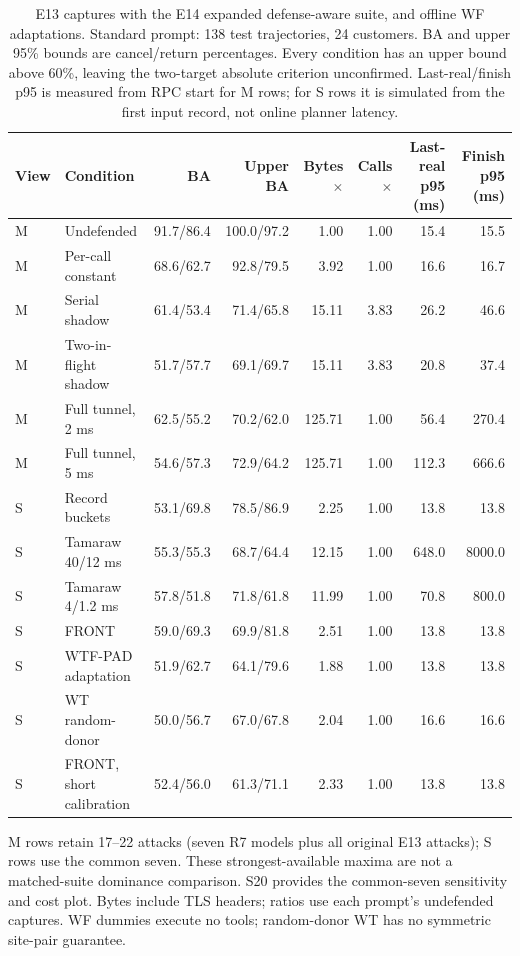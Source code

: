 \begin{table}[t]\centering\footnotesize
\caption{E13 captures with the E14 expanded defense-aware suite, and offline WF adaptations. Standard prompt: 138 test trajectories, 24 customers. BA and upper 95\% bounds are cancel/return percentages. Every condition has an upper bound above 60\%, leaving the two-target absolute criterion unconfirmed. Last-real/finish p95 is measured from RPC start for M rows; for S rows it is simulated from the first input record, not online planner latency.}\label{tab:r7-controls}
\begin{tabular}{@{}llrrrrrr@{}}\toprule
View & Condition & BA & Upper BA & Bytes$\times$ & Calls$\times$ & Last-real p95 (ms) & Finish p95 (ms)\\\midrule
M & Undefended & 91.7/86.4 & 100.0/97.2 & 1.00 & 1.00 & 15.4 & 15.5\\
M & Per-call constant & 68.6/62.7 & 92.8/79.5 & 3.92 & 1.00 & 16.6 & 16.7\\
M & Serial shadow & 61.4/53.4 & 71.4/65.8 & 15.11 & 3.83 & 26.2 & 46.6\\
M & Two-in-flight shadow & 51.7/57.7 & 69.1/69.7 & 15.11 & 3.83 & 20.8 & 37.4\\
M & Full tunnel, 2 ms & 62.5/55.2 & 70.2/62.0 & 125.71 & 1.00 & 56.4 & 270.4\\
M & Full tunnel, 5 ms & 54.6/57.3 & 72.9/64.2 & 125.71 & 1.00 & 112.3 & 666.6\\
\midrule
S & Record buckets & 53.1/69.8 & 78.5/86.9 & 2.25 & 1.00 & 13.8 & 13.8\\
S & Tamaraw 40/12 ms & 55.3/55.3 & 68.7/64.4 & 12.15 & 1.00 & 648.0 & 8000.0\\
S & Tamaraw 4/1.2 ms & 57.8/51.8 & 71.8/61.8 & 11.99 & 1.00 & 70.8 & 800.0\\
S & FRONT & 59.0/69.3 & 69.9/81.8 & 2.51 & 1.00 & 13.8 & 13.8\\
S & WTF-PAD adaptation & 51.9/62.7 & 64.1/79.6 & 1.88 & 1.00 & 13.8 & 13.8\\
S & WT random-donor & 50.0/56.7 & 67.0/67.8 & 2.04 & 1.00 & 16.6 & 16.6\\
S & FRONT, short calibration & 52.4/56.0 & 61.3/71.1 & 2.33 & 1.00 & 13.8 & 13.8\\
\bottomrule\end{tabular}
\par\smallskip\raggedright M rows retain 17--22 attacks (seven R7 models plus all original E13 attacks); S rows use the common seven. These strongest-available maxima are not a matched-suite dominance comparison. S20 provides the common-seven sensitivity and cost plot. Bytes include TLS headers; ratios use each prompt's undefended captures. WF dummies execute no tools; random-donor WT has no symmetric site-pair guarantee.
\end{table}
